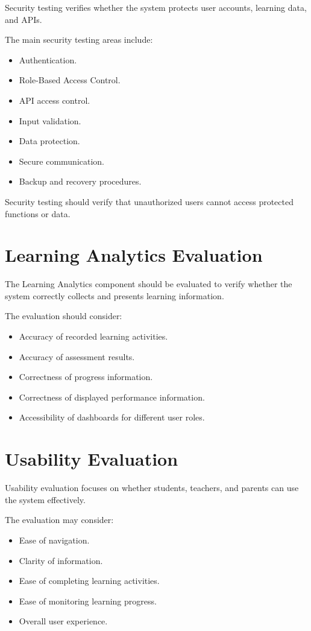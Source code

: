 Security testing verifies whether the system protects user accounts, learning data, and APIs.

The main security testing areas include:

\begin{itemize}
	\item Authentication.
	\item Role-Based Access Control.
	\item API access control.
	\item Input validation.
	\item Data protection.
	\item Secure communication.
	\item Backup and recovery procedures.
\end{itemize}

Security testing should verify that unauthorized users cannot access protected functions or data.

\section{Learning Analytics Evaluation}

The Learning Analytics component should be evaluated to verify whether the system correctly collects and presents learning information.

The evaluation should consider:

\begin{itemize}
	\item Accuracy of recorded learning activities.
	\item Accuracy of assessment results.
	\item Correctness of progress information.
	\item Correctness of displayed performance information.
	\item Accessibility of dashboards for different user roles.
\end{itemize}

\section{Usability Evaluation}

Usability evaluation focuses on whether students, teachers, and parents can use the system effectively.

The evaluation may consider:

\begin{itemize}
	\item Ease of navigation.
	\item Clarity of information.
	\item Ease of completing learning activities.
	\item Ease of monitoring learning progress.
	\item Overall user experience.
\end{itemize}

